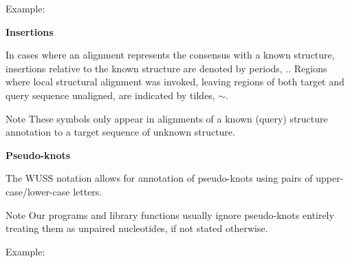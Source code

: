 \begin{DoxyItemize}
Example\+:
\begin{DoxyCode}{0}
\DoxyCodeLine{<<<\_\_\_\_>>>:::}
\end{DoxyCode}

\item {\bfseries{Insertions}}

In cases where an alignment represents the consensus with a known structure, insertions relative to the known structure are denoted by periods, {\ttfamily .}. Regions where local structural alignment was invoked, leaving regions of both target and query sequence unaligned, are indicated by tildes, {\ttfamily $\sim$}. \begin{DoxyNote}{Note}
These symbols only appear in alignments of a known (query) structure annotation to a target sequence of unknown structure.
\end{DoxyNote}

\item {\bfseries{Pseudo-\/knots}}

The W\+U\+SS notation allows for annotation of pseudo-\/knots using pairs of upper-\/case/lower-\/case letters. \begin{DoxyNote}{Note}
Our programs and library functions usually ignore pseudo-\/knots entirely treating them as unpaired nucleotides, if not stated otherwise.
\end{DoxyNote}
Example\+:
\begin{DoxyCode}{0}
\end{DoxyCode}
 
\end{DoxyItemize}

